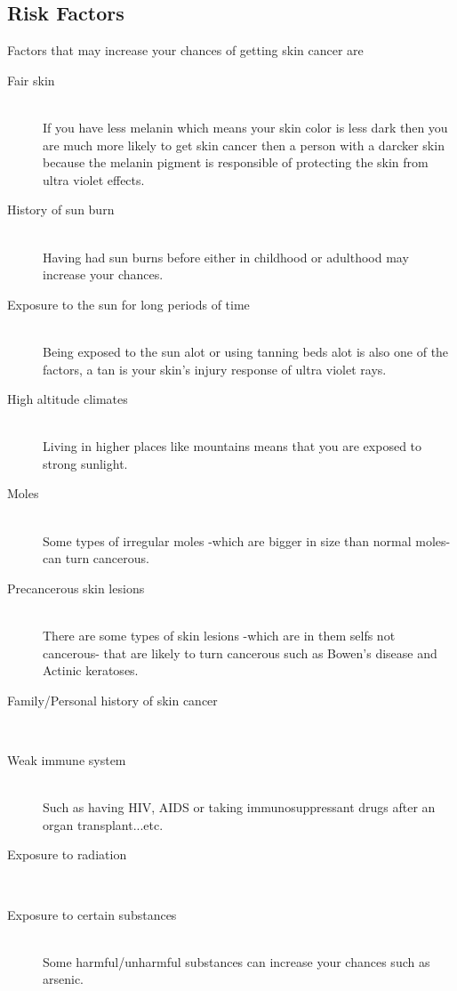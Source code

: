     \subsection{Risk Factors}
        Factors that may increase your chances of getting skin cancer are ~\cite{mayo2020}
        \begin{description}
        \item[Fair skin] \hfill \\
            If you have less melanin which means your skin color is less dark then you are much more likely to get skin cancer then a person with a darcker skin because the melanin pigment is responsible of protecting the skin from ultra violet effects.
        \item[History of sun burn] \hfill \\
            Having had sun burns before either in childhood or adulthood may increase your chances.
        \item[Exposure to the sun for long periods of time] \hfill \\
            Being exposed to the sun alot or using tanning beds alot is also one of the factors, a tan is your skin's injury response of ultra violet rays. 
        \item[High altitude climates] \hfill \\
            Living in higher places like mountains means that you are exposed to strong sunlight.
        \item[Moles] \hfill \\
            Some types of irregular moles -which are bigger in size than normal moles- can turn cancerous.
        \item[Precancerous skin lesions] \hfill \\
            There are some types of skin lesions -which are in them selfs not cancerous- that are likely to turn cancerous such as Bowen's disease and  Actinic keratoses.
        \item[Family/Personal history of skin cancer] \hfill \\
        \item[Weak immune system] \hfill \\
            Such as having HIV, AIDS or taking immunosuppressant drugs after an organ transplant...etc.
        \item[Exposure to radiation] \hfill \\
        \item[Exposure to certain substances] \hfill \\
            Some harmful/unharmful substances can increase your chances such as arsenic.
        \end{description}



